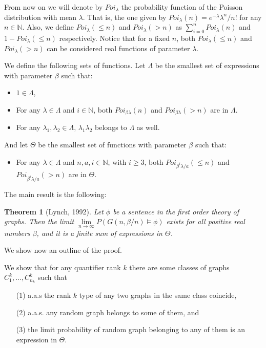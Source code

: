 \documentclass[11pt,notitlepage]{report}
\newtheorem{theorem}{Theorem}[chapter]
\theoremstyle{definition}
\theoremstyle{remark}
\newcommand{\N}{\mathbb{N}}
\begin{document}
From now on we will denote by $Poi_\lambda$ the probability
function of the Poisson distribution with mean $\lambda$.
That is, the one given by $Poi_\lambda(n)=e^{-\lambda}\lambda^n/n!$ 
for any $n\in \N$.
Also, we define $Poi_\lambda(\leq n)$ and $Poi_\lambda(>n)$ as 
$\sum_{i=0}^n Poi_\lambda(n)$ and $1-Poi_\lambda(\leq n)$
respectively. Notice that for a fixed $n$, both $Poi_\lambda(\leq n)$ 
and $Poi_\lambda(>n)$ can be considered real functions of parameter $\lambda$. \par

We define the following sets of functions. Let $\Lambda$ be the smallest 
set of expressions with parameter $\beta$ such that:

\begin{itemize}[noitemsep, topsep=0pt]
	\item $1\in \Lambda$,
	\item For any $\lambda \in \Lambda$ and $i\in \N$, 
	both $Poi_{\beta\lambda}(n)$ and $Poi_{\beta\lambda}(> n)$ are in
	$\Lambda$.
	\item For any $\lambda_1,\lambda_2 \in \Lambda$,
	$\lambda_1 \lambda_2$ belongs to $\Lambda$ as well.
\end{itemize}

And let $\Theta$ be the smallest set of functions with parameter $\beta$
such that:
\begin{itemize}[noitemsep, topsep=0pt]
	\item For any $\lambda \in \Lambda$ 
	and $n,a,i\in \N$, with $i\geq 3$, 
	both $Poi_{\beta^i\lambda/a}(\leq n)$ and $Poi_{\beta^i\lambda/a}(> n)$
	are in $\Theta$.
\end{itemize} 

The main result is the following:

\begin{theorem}[Lynch, 1992] \label{thrm:main}
	Let $\phi$ be a sentence in the first order theory of graphs. Then the limit
	$\lim\limits_{n\to \infty} P(G(n,\beta/n) \models \phi )$ exists for all positive real numbers
	$\beta$, and it is a finite sum of expressions in $\Theta$.
\end{theorem}

We show now an outline of the proof. \par 
We show that for any quantifier rank $k$ there are some classes of graphs 
$C^k_1,\dots, C^k_{n_k}$ such that
\begin{itemize}[noitemsep, topsep=0pt]
	\item[(1)] a.a.s the rank $k$ type of any two graphs in the same class coincide, 
	\item[(2)] a.a.s. any random graph belongs to some of them, and
	\item[(3)] the limit probability of random graph belonging to any of them is an expression in $\Theta$. 
\end{itemize}
\end{document}
